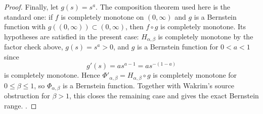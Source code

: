 \begin{proof}
Finally, let \(g(s)=s^a\).  The composition theorem used here is the standard
one: if \(f\) is completely monotone on \((0,\infty)\) and \(g\) is a
Bernstein function with \(g((0,\infty))\subset(0,\infty)\), then \(f\circ g\)
is completely monotone.  Its hypotheses are satisfied in the present case:
\(H_{\alpha,\beta}\) is completely monotone by the factor check above,
\(g(s)=s^a>0\), and \(g\) is a Bernstein function for \(0<a<1\) since
\[
  g'(s)=a s^{a-1}=a s^{-(1-a)}
\]
is completely monotone.  Hence
\(\Phi'_{\alpha,\beta}=H_{\alpha,\beta}\circ g\) is completely monotone for
\(0\le\beta\le1\), so \(\Phi_{\alpha,\beta}\) is a Bernstein function.
Together with Wakrim's source obstruction for \(\beta>1\), this closes the
remaining case and gives the exact Bernstein range. \cite{wakrim-w}.
\end{proof}


